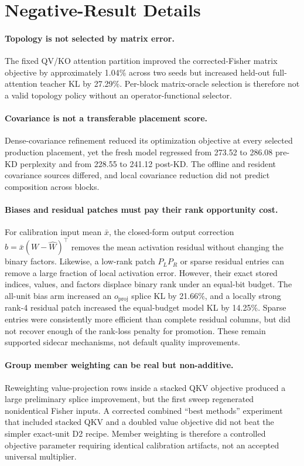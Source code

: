 \documentclass[10pt]{article}
\begin{document}
\section{Negative-Result Details}

\paragraph{Topology is not selected by matrix error.}
The fixed QV/KO attention partition improved the corrected-Fisher matrix
objective by approximately 1.04\% across two seeds but increased held-out
full-attention teacher KL by 27.29\%. Per-block matrix-oracle selection is
therefore not a valid topology policy without an operator-functional selector.

\paragraph{Covariance is not a transferable placement score.}
Dense-covariance refinement reduced its optimization objective at every
selected production placement, yet the fresh model regressed from 273.52 to
286.08 pre-KD perplexity and from 228.55 to 241.12 post-KD. The offline and
resident covariance sources differed, and local covariance reduction did not
predict composition across blocks.

\paragraph{Biases and residual patches must pay their rank opportunity cost.}
For calibration input mean $\bar x$, the closed-form output correction
$b=\bar x(W-\widehat W)^\top$ removes the mean activation residual without
changing the binary factors. Likewise, a low-rank patch $P_LP_R$ or sparse
residual entries can remove a large fraction of local activation error.
However, their exact stored indices, values, and factors displace binary rank
under an equal-bit budget. The all-unit bias arm increased an $o_{\mathrm{proj}}$
splice KL by 21.66\%, and a locally strong rank-4 residual patch increased the
equal-budget model KL by 14.25\%. Sparse entries were consistently more
efficient than complete residual columns, but did not recover enough of the
rank-loss penalty for promotion. These remain supported sidecar mechanisms,
not default quality improvements.

\paragraph{Group member weighting can be real but non-additive.}
Reweighting value-projection rows inside a stacked QKV objective produced a
large preliminary splice improvement, but the first sweep regenerated
nonidentical Fisher inputs. A corrected combined ``best methods'' experiment
that included stacked QKV and a doubled value objective did not beat the
simpler exact-unit D2 recipe. Member weighting is therefore a controlled
objective parameter requiring identical calibration artifacts, not an accepted
universal multiplier.
\end{document}
